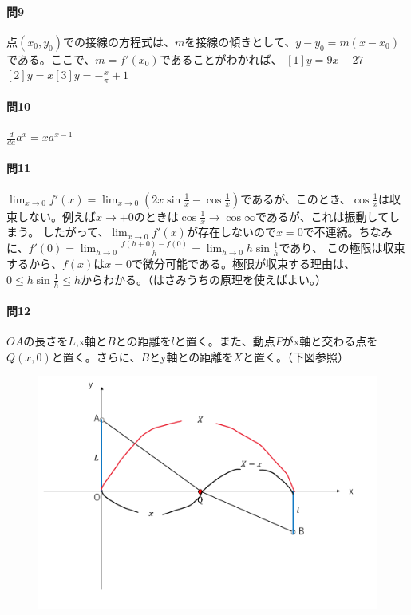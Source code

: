 \documentclass[a4j,dvipdfmx]{jsarticle}
\begin{document}
                    \paragraph{問9}点$(x_0,y_0)$での接線の方程式は、$m$を接線の傾きとして、$y-y_0=m(x-x_0)$である。ここで、$m=f'(x_0)$であることがわかれば、
                    $[1]y=9x-27$\hspace{1mm}$[2]y=x$\hspace{1mm}$[3]y=-\frac{x}{\pi}+1$

                    \paragraph{問10}$\displaystyle \frac{d}{da}a^x = xa^{x-1}$

                    \paragraph{問11}$\displaystyle \lim_{x\to 0}f'(x)=\lim_{x\to 0}\left(2x\sin\frac{1}{x}-\cos\frac{1}{x}\right)$であるが、このとき、$\cos \frac{1}{x}$は収束しない。例えば$x\to +0$のときは$\cos \frac{1}{x}\to \cos \infty$であるが、これは振動してしまう。
                    したがって、$\displaystyle \lim_{x\to 0}f'(x)$が存在しないので$x=0$で不連続。ちなみに、$\displaystyle f'(0)=\lim_{h\to 0}\frac{f(h+0)-f(0)}{h}=\lim_{h\to0}h\sin \frac{1}{h}$であり、
                    この極限は収束するから、$f(x)$は$x=0$で微分可能である。極限が収束する理由は、$0\leq h\sin\frac{1}{h}\leq h$からわかる。（はさみうちの原理を使えばよい。）

                    \paragraph{問12}$OA$の長さを$L$,x軸と$B$との距離を$l$と置く。また、動点$P$がx軸と交わる点を$Q(x,0)$と置く。さらに、$B$とy軸との距離を$X$と置く。（下図参照） 
                        \begin{figure}[h]
                            \centering
                            \includegraphics[scale=0.5]{img/QuuNote/Mondai2_12.png}
                        \end{figure}
\end{document}
